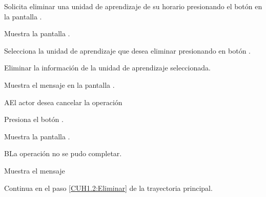 \begin{UCtrayectoria}

    \UCpaso[\UCactor] Solicita eliminar una unidad de aprendizaje de su horario presionando el botón \btnEditar en la pantalla .
    
    \UCpaso[\UCsist] Muestra la pantalla .
    
    \UCpaso[\UCactor] \label{CUH1.2:Eliminar} Selecciona la unidad de aprendizaje que desea eliminar presionando en botón \btnBorrar. 
        
    \UCpaso[\UCsist] Eliminar la información de la unidad de aprendizaje seleccionada. 
    
    \UCpaso[\UCsist] Muestra el mensaje  en la pantalla .
        
\end{UCtrayectoria}


\begin{UCtrayectoriaA}{A}{El actor desea cancelar la operación}
	
	\UCpaso[\UCactor] Presiona el botón \btnEditar.
	
	\UCpaso[\UCsist] Muestra la pantalla .
		
\end{UCtrayectoriaA}

\begin{UCtrayectoriaA}{B}{La operación no se pudo completar.}
		
	\UCpaso[\UCsist] Muestra el mensaje 
		
	\UCpaso Continua en el paso \ref{CUH1.2:Eliminar} de la trayectoria principal.
		
\end{UCtrayectoriaA}
